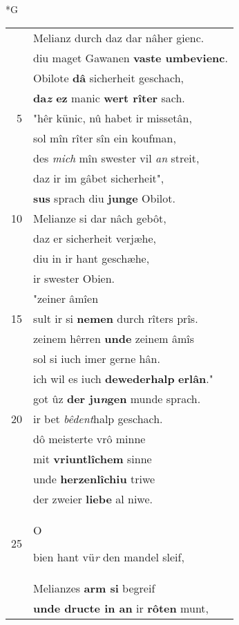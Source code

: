 \documentclass[8pt,a4paper,notitlepage]{article}
\begin{document}
\newpage
\begin{table}[ht]
\begin{minipage}[t]{0.5\linewidth}
\small
\begin{center}*G
\end{center}
\begin{tabular}{rl}
 & Melianz durch daz dar nâher gienc.\\ 
 & diu maget Gawanen \textbf{vaste umbevienc}.\\ 
 & Obilote \textbf{dâ} sicherheit geschach,\\ 
 & \textbf{da\textit{z} ez} manic \textbf{wert rîter} sach.\\ 
5 & "hêr künic, nû habet ir missetân,\\ 
 & sol mîn rîter sîn ein koufman,\\ 
 & des \textit{mich} mîn swester vil \textit{an} streit,\\ 
 & daz ir im gâbet sicherheit",\\ 
 & \textbf{sus} sprach diu \textbf{junge} Obilot.\\ 
10 & Melianze si dar nâch gebôt,\\ 
 & daz er sicherheit verjæhe,\\ 
 & diu in ir hant geschæhe,\\ 
 & ir swester Obien.\\ 
 & "zeiner âmîen\\ 
15 & sult ir si \textbf{nemen} durch rîters prîs.\\ 
 & zeinem hêrren \textbf{unde} zeinem âmîs\\ 
 & sol si iuch imer gerne hân.\\ 
 & ich wil es iuch \textbf{dewederhalp} \textbf{erlân}."\\ 
 & got ûz \textbf{der ju\textit{n}gen} munde sprach.\\ 
20 & ir bet \textit{bêdent}halp geschach.\\ 
 & dô meisterte vrô minne\\ 
 & mit \textbf{vriuntlîchem} sinne\\ 
 & unde \textbf{herzenlîchiu} triwe\\ 
 & der zweier \textbf{liebe} al niwe.\\ 
25 & \begin{large}O\end{large}bien hant vü\textit{r} den mandel sleif,\\ 
 & Melianzes \textbf{arm si} begreif\\ 
 & \textbf{unde dructe in an} ir \textbf{rôten} munt,\\ 

\end{tabular}
\end{minipage}
\end{table}
\end{document}
